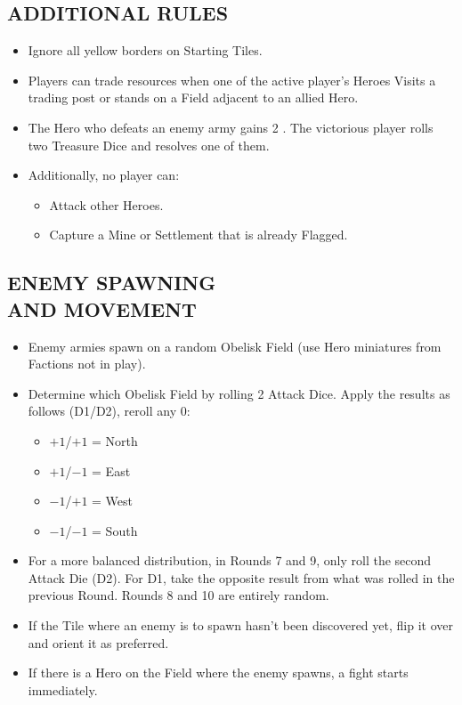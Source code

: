 \begin{multicols}{2}
\subsection*{\MakeUppercase{Additional Rules}}

\begin{itemize}
  \item Ignore all yellow borders on Starting Tiles.
  \item Players can trade resources when one of the active player's Heroes Visits a trading post or stands on a Field adjacent to an allied Hero.
  \item The Hero who defeats an enemy army gains 2 .
    The victorious player rolls two Treasure Dice and resolves one of them.
  \item Additionally, no player can:
  \begin{itemize}
      \item Attack other Heroes.
      \item Capture a Mine or Settlement that is already Flagged.
  \end{itemize}
\end{itemize}

\subsection*{\MakeUppercase{Enemy Spawning\\and Movement}}

\begin{itemize}
  \item Enemy armies spawn on a random Obelisk Field (use Hero miniatures from Factions not in play).
  \item Determine which Obelisk Field by rolling 2 Attack Dice. Apply the results as follows (D1/D2), reroll any 0:
  \begin{itemize}
    \item $+1$/$+1$ = North
    \item $+1$/$-1$ = East
    \item $-1$/$+1$ = West
    \item $-1$/$-1$ = South
  \end{itemize}

  \item For a more balanced distribution, in Rounds 7 and 9, only roll the second Attack Die (D2). For D1, take the opposite result from what was rolled in the previous Round.
  Rounds 8 and 10 are entirely random.
  \item If the Tile where an enemy is to spawn hasn't been discovered yet, flip it over and orient it as preferred.
  \item If there is a Hero on the Field where the enemy spawns, a fight starts immediately.


\end{itemize}
\end{multicols}

